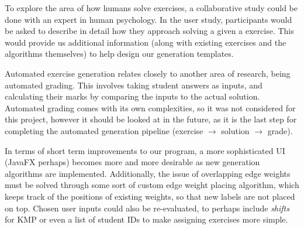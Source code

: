 \documentclass{l4proj}
\begin{document}
To explore the area of how humans solve exercises, a collaborative study could be done with an expert in human psychology. In the user study, participants would be asked to describe in detail how they approach solving a given a exercise. This would provide us additional information (along with existing exercises and the algorithms themselves) to help design our generation templates.

Automated exercise generation relates closely to another area of research, being automated grading. This involves taking student answers as inputs, and calculating their marks by comparing the inputs to the actual solution. Automated grading comes with its own complexities, so it was not considered for this project, however it should be looked at in the future, as it is the last step for completing the automated generation pipeline (exercise $\rightarrow$ solution $\rightarrow$ grade).

In terms of short term improvements to our program, a more sophisticated UI (JavaFX perhaps) becomes more and more desirable as new generation algorithms are implemented. Additionally, the issue of overlapping edge weights must be solved through some sort of custom edge weight placing algorithm, which keeps track of the positions of existing weights, so that new labels are not placed on top. Chosen user inputs could also be re-evaluated, to perhaps include \emph{shifts} for KMP or even a list of student IDs to make assigning exercises more simple.

%
% 
\end{document}
